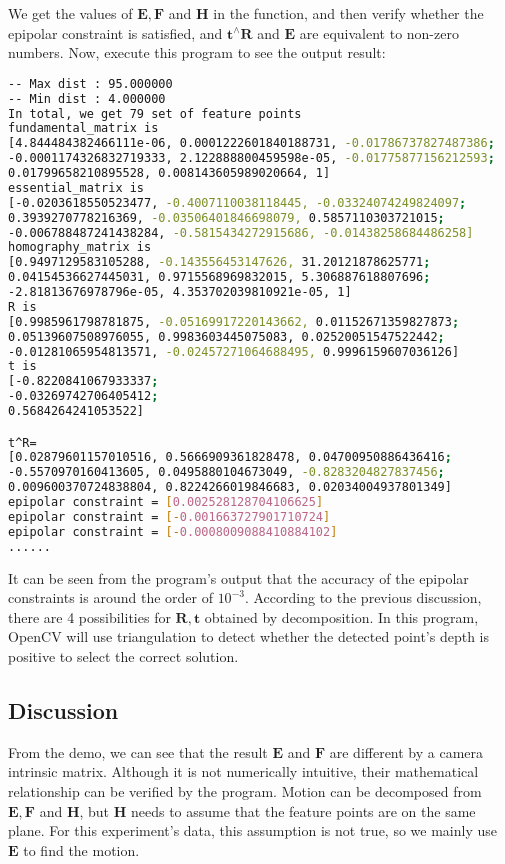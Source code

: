 We get the values of $\mathbf{E}, \mathbf{F}$ and $\mathbf{H}$ in the function, and then verify whether the epipolar constraint is satisfied, and $\mathbf{t}^ \wedge \mathbf{R}$ and $\mathbf{E}$ are equivalent to non-zero numbers. Now, execute this program to see the output result:
\begin{lstlisting}[language=sh,caption=Terminal Input：]
% build/pose_estimation_2d2d 1.png 2.png
-- Max dist : 95.000000 
-- Min dist : 4.000000 
In total, we get 79 set of feature points
fundamental_matrix is 
[4.844484382466111e-06, 0.0001222601840188731, -0.01786737827487386;
-0.0001174326832719333, 2.122888800459598e-05, -0.01775877156212593;
0.01799658210895528, 0.008143605989020664, 1]
essential_matrix is 
[-0.0203618550523477, -0.4007110038118445, -0.03324074249824097;
0.3939270778216369, -0.03506401846698079, 0.5857110303721015;
-0.006788487241438284, -0.5815434272915686, -0.01438258684486258]
homography_matrix is 
[0.9497129583105288, -0.143556453147626, 31.20121878625771;
0.04154536627445031, 0.9715568969832015, 5.306887618807696;
-2.81813676978796e-05, 4.353702039810921e-05, 1]
R is 
[0.9985961798781875, -0.05169917220143662, 0.01152671359827873;
0.05139607508976055, 0.9983603445075083, 0.02520051547522442;
-0.01281065954813571, -0.02457271064688495, 0.9996159607036126]
t is 
[-0.8220841067933337;
-0.03269742706405412;
0.5684264241053522]

t^R=
[0.02879601157010516, 0.5666909361828478, 0.04700950886436416;
-0.5570970160413605, 0.0495880104673049, -0.8283204827837456;
0.009600370724838804, 0.8224266019846683, 0.02034004937801349]
epipolar constraint = [0.002528128704106625]
epipolar constraint = [-0.001663727901710724]
epipolar constraint = [-0.0008009088410884102]
......
\end{lstlisting}

It can be seen from the program's output that the accuracy of the epipolar constraints is around the order of $10 ^{-3}$. According to the previous discussion, there are 4 possibilities for $\mathbf{R}, \mathbf{t}$ obtained by decomposition. In this program, OpenCV will use triangulation to detect whether the detected point's depth is positive to select the correct solution.

\subsection*{Discussion}
From the demo, we can see that the result $\mathbf{E}$ and $\mathbf{F}$ are different by a camera intrinsic matrix. Although it is not numerically intuitive, their mathematical relationship can be verified by the program. Motion can be decomposed from $\mathbf{E}, \mathbf{F}$ and $\mathbf{H}$, but $\mathbf{H}$ needs to assume that the feature points are on the same plane. For this experiment's data, this assumption is not true, so we mainly use $\mathbf{E}$ to find the motion.

